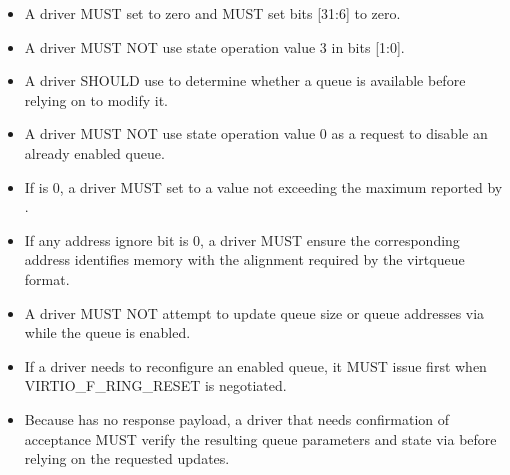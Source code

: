 \begin{itemize}
  \item A driver MUST set  to zero and MUST set 
        bits [31:6] to zero.
  \item A driver MUST NOT use state operation value 3 in  bits
        [1:0].
  \item A driver SHOULD use  to determine whether a queue is
        available before relying on  to modify it.
  \item A driver MUST NOT use state operation value 0 as a request to disable an
        already enabled queue.
  \item If  is 0, a driver MUST set  to a value
        not exceeding the maximum reported by .
  \item If any address ignore bit is 0, a driver MUST ensure the corresponding
        address identifies memory with the alignment required by the virtqueue
        format.
  \item A driver MUST NOT attempt to update queue size or queue addresses via
         while the queue is enabled.
  \item If a driver needs to reconfigure an enabled queue, it MUST issue
         first when VIRTIO\_F\_RING\_RESET is negotiated.
  \item Because  has no response payload, a driver that
        needs confirmation of acceptance MUST verify the resulting queue
        parameters and state via  before relying on the
        requested updates.
\end{itemize}


